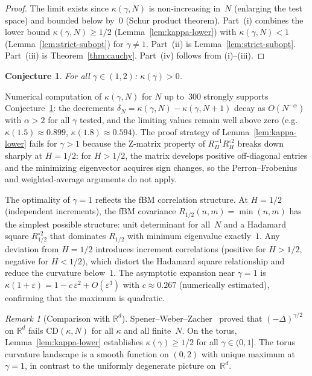 \documentclass[11pt,a4paper]{article}
\theoremstyle{plain}
\newtheorem{conjecture}[theorem]{Conjecture}
\theoremstyle{definition}
\theoremstyle{remark}
\newtheorem{remark}[theorem]{Remark}
\newcommand{\R}{\mathbb{R}}
\begin{document}
\begin{proof}
The limit exists since $\kappa(\gamma,N)$ is non-increasing
in~$N$ (enlarging the test space) and bounded below by~$0$
(Schur product theorem). Part~(i) combines the lower bound
$\kappa(\gamma,N) \geq 1/2$
(Lemma~\ref{lem:kappa-lower}) with
$\kappa(\gamma,N) < 1$ (Lemma~\ref{lem:strict-subopt}) for
$\gamma \neq 1$. Part~(ii) is Lemma~\ref{lem:strict-subopt}.
Part~(iii) is Theorem~\ref{thm:cauchy}. Part~(iv)
follows from (i)--(iii).
\end{proof}

\begin{conjecture}\label{conj:kappa-positive}
For all $\gamma \in (1,2)$: $\kappa(\gamma) > 0$.
\end{conjecture}

Numerical computation of $\kappa(\gamma,N)$ for $N$ up to~$300$
strongly supports Conjecture~\ref{conj:kappa-positive}: the
decrements $\delta_N = \kappa(\gamma,N) - \kappa(\gamma,N{+}1)$
decay as $O(N^{-\alpha})$ with $\alpha > 2$ for all $\gamma$
tested, and the limiting values remain well above zero
(e.g.\ $\kappa(1.5) \approx 0.899$, $\kappa(1.8) \approx 0.594$).
The proof strategy of Lemma~\ref{lem:kappa-lower} fails for
$\gamma > 1$ because the Z-matrix property of
$R_H^{-1} R_H^{\circ 2}$ breaks down sharply at $H = 1/2$:
for $H > 1/2$, the matrix develops positive off-diagonal entries
and the minimizing eigenvector acquires sign changes, so the
Perron--Frobenius and weighted-average arguments do not apply.

The optimality of $\gamma = 1$ reflects the fBM correlation
structure.  At $H = 1/2$ (independent increments), the fBM
covariance $R_{1/2}(n,m) = \min(n,m)$ has the simplest possible
structure: unit determinant for all~$N$ and a Hadamard square
$R_{1/2}^{\circ 2}$ that dominates $R_{1/2}$ with minimum
eigenvalue exactly~$1$.
Any deviation from $H = 1/2$ introduces increment correlations
(positive for $H > 1/2$, negative for $H < 1/2$), which distort
the Hadamard square relationship and reduce the curvature
below~$1$.
The asymptotic expansion near $\gamma = 1$ is
$\kappa(1+\varepsilon) = 1 - c\,\varepsilon^2 + O(\varepsilon^3)$
with $c \approx 0.267$ (numerically estimated), confirming that
the maximum is quadratic.

\begin{remark}[Comparison with $\R^d$]\label{rem:Rd}
Spener--Weber--Zacher~\cite{SpenerWeberZacher2020} proved that
$(-\Delta)^{\gamma/2}$ on $\R^d$ fails $\mathrm{CD}(\kappa,N)$
for all $\kappa$ and all finite~$N$.
On the torus, Lemma~\ref{lem:kappa-lower} establishes
$\kappa(\gamma) \geq 1/2$ for all $\gamma \in (0,1]$.
The torus curvature landscape is a smooth function on $(0,2)$
with unique maximum at $\gamma = 1$, in contrast to the
uniformly degenerate picture on~$\R^d$.
\end{remark}
\end{document}
